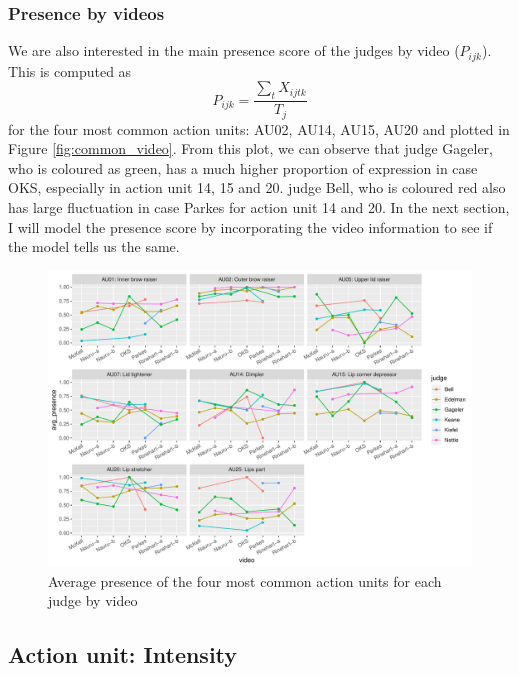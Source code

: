 \documentclass{monashthesis}
\begin{document}
\hypertarget{presence-by-videos}{%
\subsubsection{Presence by videos}\label{presence-by-videos}}

We are also interested in the main presence score of the judges by video (\(P_{ijk}\)). This is computed as \[P_{ijk} = \frac{\sum_{t}X_{ijtk}}{T_j}\] for the four most common action units: AU02, AU14, AU15, AU20 and plotted in Figure \ref{fig:common_video}. From this plot, we can observe that judge Gageler, who is coloured as green, has a much higher proportion of expression in case OKS, especially in action unit 14, 15 and 20. judge Bell, who is coloured red also has large fluctuation in case Parkes for action unit 14 and 20. In the next section, I will model the presence score by incorporating the video information to see if the model tells us the same.

\begin{figure}

{\centering \includegraphics[width=1\linewidth]{figures/au-video-1} 

}

\caption{Average presence of the four most common action units for each judge by video\label{fig:common_video}}\label{fig:au-video}
\end{figure}

\hypertarget{action-unit-intensity}{%
\subsection{Action unit: Intensity}\label{action-unit-intensity}}
\end{document}
